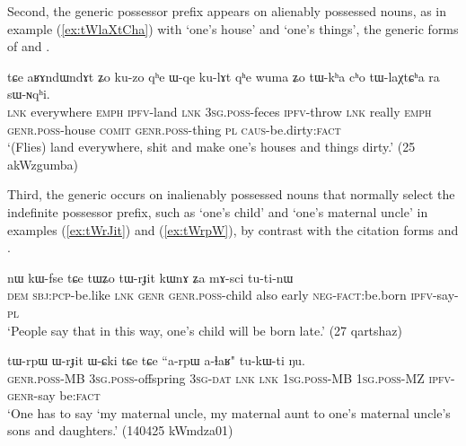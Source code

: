 Second, the generic possessor prefix appears on alienably possessed nouns, as in example (\ref{ex:tWlaXtCha}) with  `one's house' and  `one's things', the generic forms of  and .

\begin{exe}
\ex \label{ex:tWlaXtCha}
\gll tɕe aʁɤndɯndɤt ʑo ku-zo qʰe ɯ-qe ku-lɤt qʰe wuma ʑo tɯ-kʰa cʰo tɯ-laχtɕʰa ra sɯ-ɴqʰi. \\
\textsc{lnk} everywhere \textsc{emph} \textsc{ipfv}-land \textsc{lnk} \textsc{3sg}.\textsc{poss}-feces \textsc{ipfv}-throw \textsc{lnk} really \textsc{emph} \textsc{genr}.\textsc{poss}-house \textsc{comit} \textsc{genr}.\textsc{poss}-thing \textsc{pl} \textsc{caus}-be.dirty:\textsc{fact} \\
\glt `(Flies) land everywhere, shit and make one's houses and things dirty.' (25 akWzgumba)
\end{exe}

Third, the generic  occurs on inalienably possessed nouns that normally select the  indefinite possessor prefix, such as  `one's child' and  `one's maternal uncle' in examples (\ref{ex:tWrJit}) and (\ref{ex:tWrpW}), by contrast with the citation forms  and .

\begin{exe}
\ex \label{ex:tWrJit}
\gll nɯ kɯ-fse tɕe tɯʑo tɯ-rɟit kɯnɤ ʑa mɤ-sci tu-ti-nɯ \\
\textsc{dem} \textsc{sbj}:\textsc{pcp}-be.like \textsc{lnk} \textsc{genr} \textsc{genr}.\textsc{poss}-child also early \textsc{neg}-\textsc{fact}:be.born \textsc{ipfv}-say-\textsc{pl} \\
\glt `People say that in this way, one's child will be born late.' (27 qartshaz)
\end{exe}

\begin{exe}
\ex \label{ex:tWrpW}
\gll tɯ-rpɯ ɯ-rɟit ɯ-ɕki tɕe tɕe ``a-rpɯ a-ɬaʁ" tu-kɯ-ti ŋu. \\
\textsc{genr}.\textsc{poss}-MB \textsc{3sg}.\textsc{poss}-offspring \textsc{3sg}-\textsc{dat} \textsc{lnk} \textsc{lnk} \textsc{1sg}.\textsc{poss}-MB \textsc{1sg}.\textsc{poss}-MZ \textsc{ipfv}-\textsc{genr}-say be:\textsc{fact} \\
\glt `One has to say `my maternal uncle, my maternal aunt to one's maternal uncle's sons and daughters.' (140425 kWmdza01)
\end{exe}

